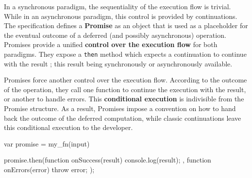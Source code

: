 
In a synchronous paradigm, the sequentiality of the execution flow is trivial.
While in an asynchronous paradigm, this control is provided by continuations.
The specification defines a \textbf{Promise} as an object that is used as a placeholder for the eventual outcome of a deferred (and possibly asynchronous) operation.
Promises provide a unified \textbf{control over the execution flow} for both paradigms.
They expose a \texttt{then} method which expects a continuation to continue with the result ; this result being synchronously or asynchronously available.


Promises force another control over the execution flow.
According to the outcome of the operation, they call one function to continue the execution with the result, or another to handle errors.
This \textbf{conditional execution} is indivisible from the Promise structure.
As a result, Promises impose a convention on how to hand back the outcome of the deferred computation, while classic continuations leave this conditional execution to the developer.

\begin{code}[js, %
             caption={Example of a promise}, %
             label={lst:then}] %
var promise = my_fn(input)

promise.then(function onSuccess(result) {
  console.log(result);
}, function onErrors(error) {
  throw error;
});
\end{code}

